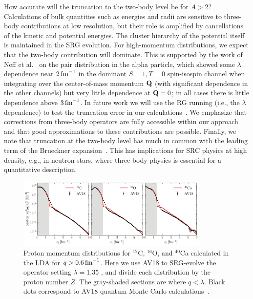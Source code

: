 \documentclass[10pt,aps,prc,floatfix,twocolumn,nofootinbib]{revtex4-1}
\begin{document}
How accurate will the truncation to the two-body level be for $A>2$?
Calculations of bulk quantities such as energies and radii are sensitive to three-body contributions at low resolution, but their role is amplified by cancellations of the kinetic and potential energies.
The cluster hierarchy of the potential itself is maintained in the SRG evolution.
For high-momentum distributions, we expect that the two-body contribution will dominate.
This is supported by the work of Neff et al.~\cite{Neff:2015xda} on the pair distribution in the alpha particle, which showed some $\lambda$ dependence near $2\,\mbox{fm}^{-1}$ in  the dominant $S=1,T=0$ spin-isospin channel when integrating over the center-of-mass momentum $\mathbf{Q}$ (with significant dependence in the other channels) but very little dependence at $\mathbf{Q} = 0$; in all cases there is little dependence above $3\,\mbox{fm}^{-1}$.
In future work we will use the RG running (i.e., the $\lambda$ dependence) to test the truncation error in our calculations~\cite{Tropiano:2021prep}.
We emphasize that corrections from three-body operators are fully accessible within our approach and that good approximations to these contributions are possible.
Finally, we note that truncation at the two-body level has much in common with the leading term of the Brueckner expansion~\cite{Brueckner:1955zzd,Tropiano:2021prep}. This has implications for SRC physics at high density, e.g., in neutron stars, where three-body physics is essential for a quantitative description.


\begin{figure}[tbh]
	\includegraphics[clip,width=0.85\textwidth]{figures_low_res/snmd_tails_with_AV18_multiplot_channels_1S0_3S1_kvnn_6_lamb_1p35_kmax_15p0.png}
    \caption{Proton momentum distributions for $^{12}$C, $^{16}$O, and $^{40}$Ca calculated in the LDA for $q>0.6\,\mbox{fm}^{-1}$. Here we use AV18 to SRG-evolve the operator setting $\lambda=1.35$ \fmi, and divide each distribution by the proton number $Z$. The gray-shaded sections are where $q<\lambda$. Black dots correspond to AV18 quantum Monte Carlo calculations~\cite{Wiringa:single_distributions}.}
    \label{fig:proton_momentum_distributions}
\end{figure}
%
\end{document}

